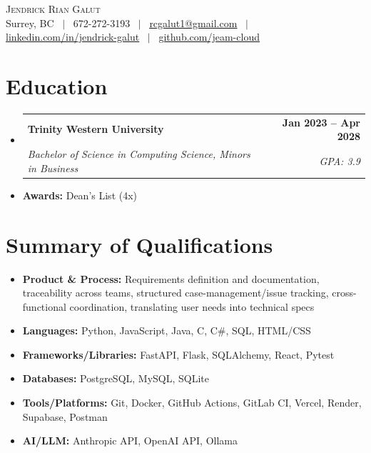 \documentclass[letterpaper,10pt]{article}
\makeatletter
\newcommand{\resumeSkill}[1]{\item[]\small{#1 \vspace{-2pt}}}
\newcommand{\resumeSubheading}[4]{%
  \vspace{-2pt}\item[]
    \begin{tabular*}{1.0\textwidth}[t]{l@{\extracolsep{\fill}}r}
      \textbf{#1} & \textbf{\small #2} \\
      \textit{\small #3} & \textit{\small #4} \\
    \end{tabular*}\vspace{-4pt}
}
\newcommand{\resumeSubHeadingListStart}{\begin{itemize}[leftmargin=0in, itemsep=0pt]}
\newcommand{\resumeSubHeadingListEnd}{\end{itemize}}
\makeatother
\begin{document}
\begin{center}
    {\LARGE \scshape Jendrick Rian Galut} \\ \vspace{1pt}
    \small Surrey, BC ~$|$~
    672-272-3193 ~$|$~
    \href{mailto:rcgalut1@gmail.com}{\underline{rcgalut1@gmail.com}} ~$|$~
    \href{https://www.linkedin.com/in/jendrick-rian-galut-374310307/}{\underline{linkedin.com/in/jendrick-galut}} ~$|$~
    \href{https://github.com/Jeam-cloud}{\underline{github.com/jeam-cloud}}
    \vspace{-5pt}
\end{center}
\section{Education}
\resumeSubHeadingListStart
    \resumeSubheading
      {Trinity Western University}{Jan 2023 -- Apr 2028}
      {Bachelor of Science in Computing Science, Minors in Business}{GPA: 3.9}
    \item[] \small \textbf{Awards:} Dean's List (4x)
\resumeSubHeadingListEnd
\vspace{-14pt}
\section{Summary of Qualifications}
\resumeSubHeadingListStart
    \resumeSkill{\textbf{Product \& Process:} Requirements definition and documentation, traceability across teams, structured case-management/issue tracking, cross-functional coordination, translating user needs into technical specs}
    \resumeSkill{\textbf{Languages:} Python, JavaScript, Java, C, C\#, SQL, HTML/CSS}
    \resumeSkill{\textbf{Frameworks/Libraries:} FastAPI, Flask, SQLAlchemy, React, Pytest}
    \resumeSkill{\textbf{Databases:} PostgreSQL, MySQL, SQLite}
    \resumeSkill{\textbf{Tools/Platforms:} Git, Docker, GitHub Actions, GitLab CI, Vercel, Render, Supabase, Postman}
    \resumeSkill{\textbf{AI/LLM:} Anthropic API, OpenAI API, Ollama}
\resumeSubHeadingListEnd
\vspace{-14pt}
\end{document}
